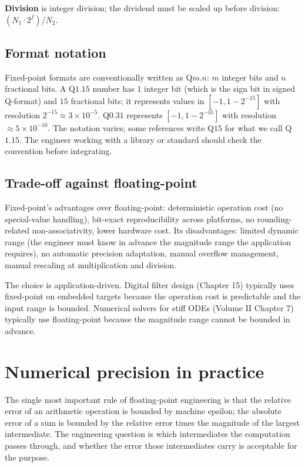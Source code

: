 \textbf{Division} is integer division; the dividend must be scaled up before division: $(N_1 \cdot 2^{f}) / N_2$.

\subsection{Format notation}

Fixed-point formats are conventionally written as Q$m.n$: $m$ integer bits and $n$ fractional bits. A Q$1.15$ number has $1$ integer bit (which is the sign bit in signed Q-format) and $15$ fractional bits; it represents values in $[-1, 1 - 2^{-15}]$ with resolution $2^{-15} \approx 3 \times 10^{-5}$. Q$0.31$ represents $[-1, 1 - 2^{-31}]$ with resolution $\approx 5 \times 10^{-10}$. The notation varies; some references write Q$15$ for what we call Q$1.15$. The engineer working with a library or standard should check the convention before integrating.

\subsection{Trade-off against floating-point}

Fixed-point's advantages over floating-point: deterministic operation cost (no special-value handling), bit-exact reproducibility across platforms, no rounding-related non-associativity, lower hardware cost. Its disadvantages: limited dynamic range (the engineer must know in advance the magnitude range the application requires), no automatic precision adaptation, manual overflow management, manual rescaling at multiplication and division.

The choice is application-driven. Digital filter design (Chapter 15) typically uses fixed-point on embedded targets because the operation cost is predictable and the input range is bounded. Numerical solvers for stiff ODEs (Volume II Chapter 7) typically use floating-point because the magnitude range cannot be bounded in advance.

\section{Numerical precision in practice}

The single most important rule of floating-point engineering is that the relative error of an arithmetic operation is bounded by machine epsilon; the absolute error of a sum is bounded by the relative error times the magnitude of the largest intermediate. The engineering question is which intermediates the computation passes through, and whether the error those intermediates carry is acceptable for the purpose.

